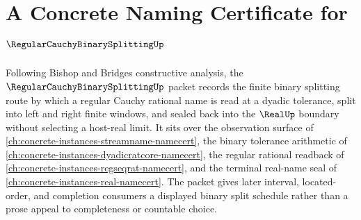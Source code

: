 \chapter{A Concrete Naming Certificate for $\RegularCauchyBinarySplittingUp$}
\label{ch:concrete-instances-regular-cauchy-binary-splitting-namecert}

Following Bishop and Bridges constructive analysis, the $\RegularCauchyBinarySplittingUp$ packet records the finite binary splitting route by which a regular Cauchy rational name is read at a dyadic tolerance, split into left and right finite windows, and sealed back into the $\RealUp$ boundary without selecting a host-real limit. It sits over the observation surface of \autoref{ch:concrete-instances-streamname-namecert}, the binary tolerance arithmetic of \autoref{ch:concrete-instances-dyadicratcore-namecert}, the regular rational readback of \autoref{ch:concrete-instances-regseqrat-namecert}, and the terminal real-name seal of \autoref{ch:concrete-instances-real-namecert}. The packet gives later interval, located-order, and completion consumers a displayed binary split schedule rather than a prose appeal to completeness or countable choice.

